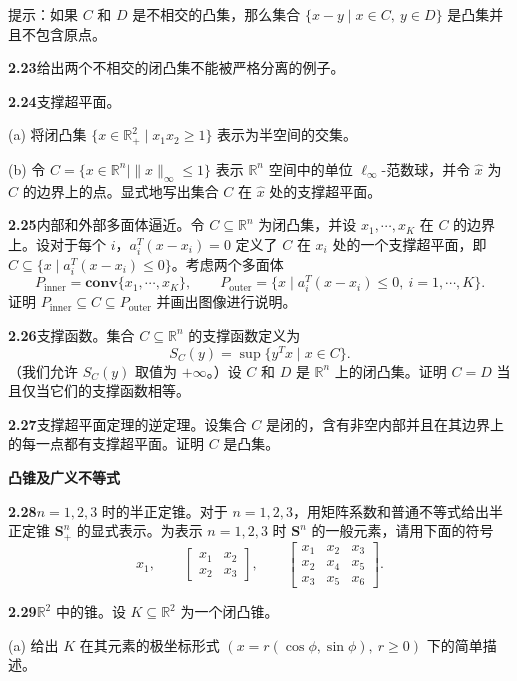 \documentclass[UTF8, 12pt, fontset=fandol, oneside]{ctexart}
\begin{document}
提示：如果 $C$ 和 $D$ 是不相交的凸集，那么集合 $\{x-y\mid x\in C,\ y\in D\}$ 是凸集并且不包含原点。

\noindent\textbf{2.23}\quad 给出两个不相交的闭凸集不能被严格分离的例子。

\noindent\textbf{2.24}\quad 支撑超平面。

\noindent(a) 将闭凸集 $\{x\in\mathbb{R}_+^2\mid x_1x_2\ge1\}$ 表示为半空间的交集。

\noindent(b) 令 $C=\{x\in\mathbb{R}^n\mid \|x\|_\infty\le1\}$ 表示 $\mathbb{R}^n$ 空间中的单位 $\ell_\infty$-范数球，并令 $\hat{x}$ 为 $C$ 的边界上的点。显式地写出集合 $C$ 在 $\hat{x}$ 处的支撑超平面。

\noindent\textbf{2.25}\quad 内部和外部多面体逼近。令 $C\subseteq\mathbb{R}^n$ 为闭凸集，并设 $x_1,\cdots,x_K$ 在 $C$ 的边界上。设对于每个 $i$，$a_i^T(x-x_i)=0$ 定义了 $C$ 在 $x_i$ 处的一个支撑超平面，即 $C\subseteq\{x\mid a_i^T(x-x_i)\le0\}$。考虑两个多面体
\[
  P_{\mathrm{inner}}=\mathbf{conv}\{x_1,\cdots,x_K\},\qquad
  P_{\mathrm{outer}}=\{x\mid a_i^T(x-x_i)\le0,\ i=1,\cdots,K\}.
\]
证明 $P_{\mathrm{inner}}\subseteq C\subseteq P_{\mathrm{outer}}$ 并画出图像进行说明。

\noindent\textbf{2.26}\quad 支撑函数。集合 $C\subseteq\mathbb{R}^n$ 的支撑函数定义为
\[
  S_C(y)=\sup\{y^Tx\mid x\in C\}.
\]
（我们允许 $S_C(y)$ 取值为 $+\infty$。）设 $C$ 和 $D$ 是 $\mathbb{R}^n$ 上的闭凸集。证明 $C=D$ 当且仅当它们的支撑函数相等。

\noindent\textbf{2.27}\quad 支撑超平面定理的逆定理。设集合 $C$ 是闭的，含有非空内部并且在其边界上的每一点都有支撑超平面。证明 $C$ 是凸集。

\noindent\textbf{凸锥及广义不等式}

\noindent\textbf{2.28}\quad $n=1,2,3$ 时的半正定锥。对于 $n=1,2,3$，用矩阵系数和普通不等式给出半正定锥 $\mathbf{S}_+^n$ 的显式表示。为表示 $n=1,2,3$ 时 $\mathbf{S}^n$ 的一般元素，请用下面的符号
\[
  x_1,\qquad
  \begin{bmatrix} x_1 & x_2\\ x_2 & x_3 \end{bmatrix},\qquad
  \begin{bmatrix} x_1 & x_2 & x_3\\ x_2 & x_4 & x_5\\ x_3 & x_5 & x_6 \end{bmatrix}.
\]

\noindent\textbf{2.29}\quad $\mathbb{R}^2$ 中的锥。设 $K\subseteq\mathbb{R}^2$ 为一个闭凸锥。

\noindent(a) 给出 $K$ 在其元素的极坐标形式 $(x=r(\cos\phi,\sin\phi),\ r\ge0)$ 下的简单描述。
\end{document}
